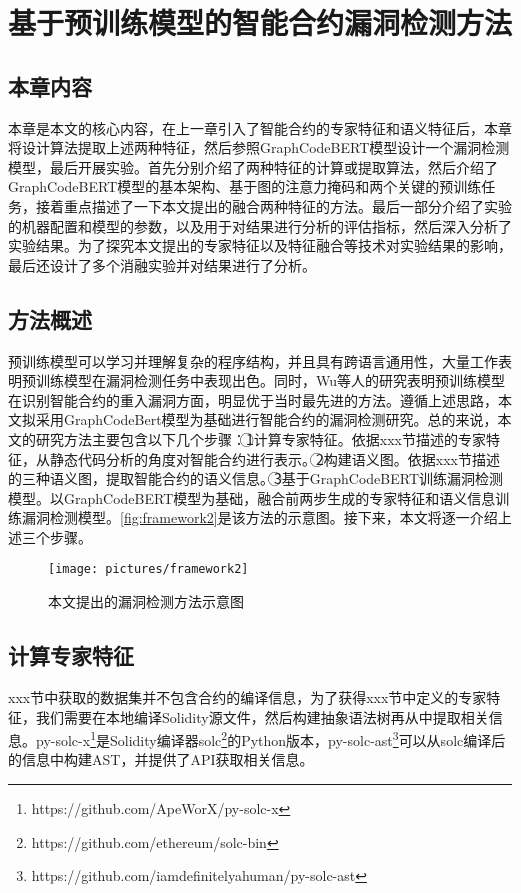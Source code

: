\chapter{基于预训练模型的智能合约漏洞检测方法}
\section{本章内容}
\label{sec:本章内容4}
本章是本文的核心内容，在上一章引入了智能合约的专家特征和语义特征后，本章将设计算法提取上述两种特征，然后参照GraphCodeBERT模型设计一个漏洞检测模型，最后开展实验。首先分别介绍了两种特征的计算或提取算法，然后介绍了GraphCodeBERT模型的基本架构、基于图的注意力掩码和两个关键的预训练任务，接着重点描述了一下本文提出的融合两种特征的方法。最后一部分介绍了实验的机器配置和模型的参数，以及用于对结果进行分析的评估指标，然后深入分析了实验结果。为了探究本文提出的专家特征以及特征融合等技术对实验结果的影响，最后还设计了多个消融实验并对结果进行了分析。
\section{方法概述}
\label{sec:方法概述}
预训练模型可以学习并理解复杂的程序结构，并且具有跨语言通用性，大量工作表明预训练模型在漏洞检测任务中表现出色\cite{pretrained_is_good_1,pretrained_is_good_2,pretrained_is_good_3}。同时，Wu等人的研究表明预训练模型在识别智能合约的重入漏洞方面，明显优于当时最先进的方法\cite{wu2021peculiar}。遵循上述思路，本文拟采用GraphCodeBert模型为基础进行智能合约的漏洞检测研究。总的来说，本文的研究方法主要包含以下几个步骤：\textcircled{1}计算专家特征。依据xxx节描述的专家特征，从静态代码分析的角度对智能合约进行表示。\textcircled{2}构建语义图。依据xxx节描述的三种语义图，提取智能合约的语义信息。\textcircled{3}基于GraphCodeBERT训练漏洞检测模型。以GraphCodeBERT模型为基础，融合前两步生成的专家特征和语义信息训练漏洞检测模型。\autoref{fig:framework2}是该方法的示意图。接下来，本文将逐一介绍上述三个步骤。
\begin{figure}[htbp]
    \centering
    \texttt{[image: pictures/framework2]}
    \caption{\label{fig:framework2}本文提出的漏洞检测方法示意图}
\end{figure}

\section{计算专家特征}
\label{sec:计算专家特征}
xxx节中获取的数据集并不包含合约的编译信息，为了获得xxx节中定义的专家特征，我们需要在本地编译Solidity源文件，然后构建抽象语法树再从中提取相关信息。py-solc-x\footnote{https://github.com/ApeWorX/py-solc-x}是Solidity编译器solc\footnote{https://github.com/ethereum/solc-bin}的Python版本，py-solc-ast\footnote{https://github.com/iamdefinitelyahuman/py-solc-ast}可以从solc编译后的信息中构建AST，并提供了API获取相关信息。

